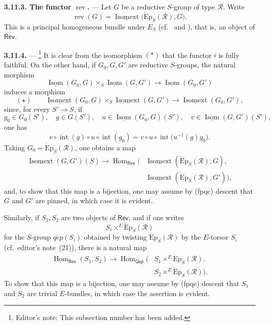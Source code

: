 \medskip\noindent\textbf{3.11.3. The functor
\(\operatorname{rev}\).} ---
Let \(G\) be a reductive \(S\)-group of type \(\mathscr R\). Write
\[
  \operatorname{rev}(G)
  =
  \underline{\operatorname{Isomext}}
    \bigl(\operatorname{\acute{E}p}_S(\mathscr R),G\bigr).
\]
This is a principal homogeneous bundle under \(E_S\)
(cf.\  and ), that is, an object of \(\mathsf{Rev}\).

\medskip\noindent\textbf{3.11.4.} ---
\footnote{Editor's note: This subsection number has been added.}
It is clear from the isomorphism  \((*)\) that the functor \(i\)
is fully faithful. On the other hand, if \(G_0,G,G'\) are reductive
\(S\)-groups, the natural morphism
\[
  \underline{\operatorname{Isom}}(G_0,G)
  \times_S
  \underline{\operatorname{Isom}}(G,G')
  \longrightarrow
  \underline{\operatorname{Isom}}(G_0,G')
\]
induces a morphism
\[
  (\star)\qquad
  \underline{\operatorname{Isomext}}(G_0,G)
  \times_S
  \underline{\operatorname{Isomext}}(G,G')
  \longrightarrow
  \underline{\operatorname{Isomext}}(G_0,G'),
\]
since, for every \(S'\to S\), if
\[
  g_0\in G_0(S'),\quad g\in G(S'),\quad
  u\in\underline{\operatorname{Isom}}(G_0,G)(S'),\quad
  v\in\underline{\operatorname{Isom}}(G,G')(S'),
\]
one has
\[
  v\circ\operatorname{int}(g)\circ u\circ\operatorname{int}(g_0)
  =
  v\circ u\circ
  \operatorname{int}\bigl(u^{-1}(g)g_0\bigr).
\]
Taking \(G_0=\operatorname{\acute{E}p}_S(\mathscr R)\), one obtains
a map
\[
\begin{aligned}
  \underline{\operatorname{Isomext}}(G,G')(S)
  \longrightarrow
  \operatorname{Hom}_{\mathsf{Rev}}\bigl(
  &\underline{\operatorname{Isomext}}
    (\operatorname{\acute{E}p}_S(\mathscr R),G),\\
  &\underline{\operatorname{Isomext}}
    (\operatorname{\acute{E}p}_S(\mathscr R),G')
  \bigr),
\end{aligned}
\]
and, to show that this map is a bijection, one may assume by
\textup{(fpqc)} descent that \(G\) and \(G'\) are pinned, in which
case it is evident.


Similarly, if \(S_1,S_2\) are two objects of \(\mathsf{Rev}\), and
if one writes
\[
  S_i\times^E\operatorname{\acute{E}p}_S(\mathscr R)
\]
for the \(S\)-group \(q\acute{e}p(S_i)\) obtained by twisting
\(\operatorname{\acute{E}p}_S(\mathscr R)\) by the \(E\)-torsor
\(S_i\) (cf.\ editor's note~(21)), there is a natural map
\[
\begin{aligned}
  \operatorname{Hom}_{\mathsf{Rev}}(S_1,S_2)
  \longrightarrow
  \operatorname{Hom}_{\mathsf{Q\acute{e}p}}\bigl(
    &S_1\times^E\operatorname{\acute{E}p}_S(\mathscr R),\\
    &S_2\times^E\operatorname{\acute{E}p}_S(\mathscr R)
  \bigr).
\end{aligned}
\]
To show that this map is a bijection, one may assume by
\textup{(fpqc)} descent that \(S_1\) and \(S_2\) are trivial
\(E\)-bundles, in which case the assertion is evident.

